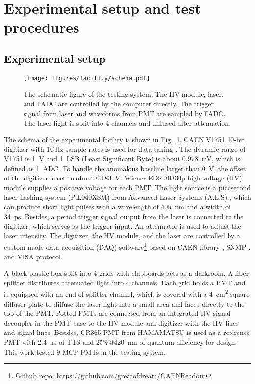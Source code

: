 \section{Experimental setup and test procedures}
\label{SetUp}
\subsection{Experimental setup}
\label{sec:setup}
\begin{figure}[!htbp]
    \centering
    \texttt{[image: figures/facility/schema.pdf]}
    \caption{The schematic figure of the testing system. The HV module, laser, and FADC are controlled by the computer directly. The trigger signal from laser and waveforms from PMT are sampled by FADC. The laser light is split into 4 channels and diffused after attenuation.}
    \label{fig:facility}
\end{figure}

The schema of the experimental facility is shown in Fig.~\ref{fig:facility}. CAEN V1751 10-bit digitizer with 1GHz sample rates is used for data taking \cite{CAENV1751}. The dynamic range of V1751 is \SI{1}{V} and \SI{1}{LSB} (Least Significant Byte) is about \SI{0.978}{mV}, which is defined as \SI{1}{ADC}. To handle the anomalous baseline larger than \SI{0}{V}, the offset of the digitizer is set to about \SI{0.183}{V}. Wiener EDS 30330p high voltage (HV) module \cite{WIENERHV} supplies a positive voltage for each PMT. The light source is a picosecond laser flashing system (PiL040XSM) from Advanced Laser Systems (A.L.S) \cite{NTKLaser}, which can produce short light pulses with a wavelength of \SI{405}{nm} and a width of \SI{34}{ps}. Besides, a period trigger signal output from the laser is connected to the digitizer, which serves as the trigger input. An attenuator is used to adjust the laser intensity. The digitizer, the HV module, and the laser are controlled by a custom-made data acquisition (DAQ) software\footnote{Github repo: \url{https://github.com/greatofdream/CAENReadout}} based on CAEN library \cite{CAENLIB}, SNMP \cite{SNMP}, and VISA \cite{VISA} protocol.

A black plastic box split into 4 grids with clapboards acts as a darkroom. A fiber splitter distributes attenuated light into 4 channels. Each grid holds a PMT and is equipped with an end of splitter channel, which is covered with a \SI{4}{cm\tothe{2}} square diffuser plate to diffuse the laser light into a small area and faces directly to the top of the PMT. Potted PMTs are connected from an integrated HV-signal decoupler in the PMT base to the HV module and digitizer with the HV lines and signal lines. Besides, CR365 PMT \cite{BJBS} from HAMAMATSU is used as a reference PMT with \SI{2.4}{ns} of TTS and 25\%@\SI{420}{nm} of quantum efficiency for design.
This work tested 9 MCP-PMTs in the testing system.

